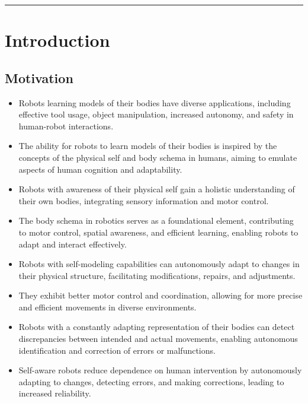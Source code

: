 \documentclass[12pt, a4paper]{article}
\begin{document}
\rule{\textwidth}{0.4pt}

\newpage
\section*{Introduction}

\subsection*{Motivation}
\begin{itemize}
	\item Robots learning models of their bodies have diverse applications, including effective tool usage, object manipulation, increased autonomy, and safety in human-robot interactions.

	\item The ability for robots to learn models of their bodies is inspired by the concepts of the physical self and body schema in humans, aiming to emulate aspects of human cognition and adaptability.

	\item Robots with awareness of their physical self gain a holistic understanding of their own bodies, integrating sensory information and motor control.

	\item The body schema in robotics serves as a foundational element, contributing to motor control, spatial awareness, and efficient learning, enabling robots to adapt and interact effectively.

	\item Robots with self-modeling capabilities can autonomously adapt to changes in their physical structure, facilitating modifications, repairs, and adjustments.

	\item They exhibit better motor control and coordination, allowing for more precise and efficient movements in diverse environments.

	\item Robots with a constantly adapting representation of their bodies can detect discrepancies between intended and actual movements, enabling autonomous identification and correction of errors or malfunctions.

	\item Self-aware robots reduce dependence on human intervention by autonomously adapting to changes, detecting errors, and making corrections, leading to increased reliability.

\end{itemize}
\end{document}
